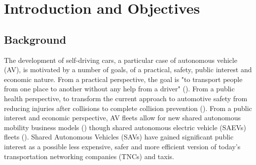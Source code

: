 
\chapter{Introduction and Objectives}

\label{Intro} 



\section{Background}




The development of self-driving cars, a particular case of autonomous vehicle (AV), is motivated by a number of goals, of a practical, safety, public interest and economic nature.
 From a practical perspective, the goal is "to transport people from one place to another without any help from a driver" (\cite{s20092544}).
 From a public health perspective, to
transform the current approach
to automotive safety from reducing injuries after collisions to
 complete collision prevention (\cite{Fleetwood_2017}).
From a public interest and economic perspective, AV fleets allow for new shared autonomous mobility business models 
(\cite{riggs2019business})
though shared autonomous electric vehicle (SAEVs) fleets (\cite{loeb2019fleet}). Shared Autonomous Vehicles (SAVs) have gained significant public interest as a possible less expensive, safer and more efficient version of today’s transportation networking companies (TNCs) and taxis.

